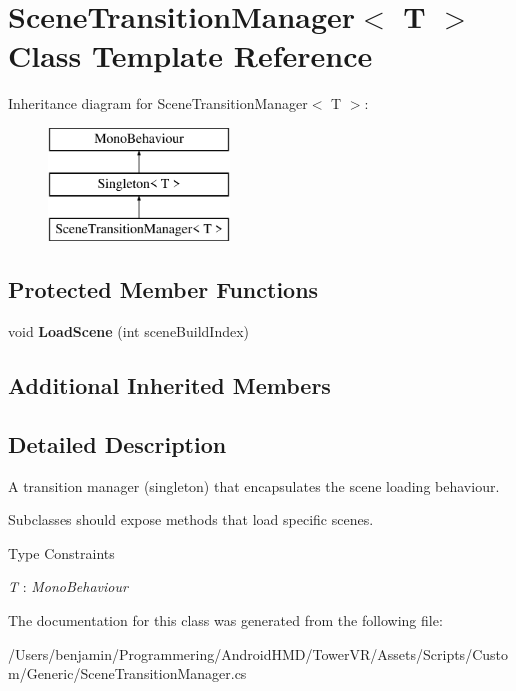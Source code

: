 \hypertarget{class_scene_transition_manager}{}\section{Scene\+Transition\+Manager$<$ T $>$ Class Template Reference}
\label{class_scene_transition_manager}
Inheritance diagram for Scene\+Transition\+Manager$<$ T $>$\+:\begin{figure}[H]
\begin{center}
\leavevmode
\includegraphics[height=3.000000cm]{class_scene_transition_manager}
\end{center}
\end{figure}
\subsection*{Protected Member Functions}
\begin{DoxyCompactItemize}
\item 
void {\bfseries Load\+Scene} (int scene\+Build\+Index)\hypertarget{class_scene_transition_manager_a1779dbd605c614cf8baf0797f08b3240}{}\label{class_scene_transition_manager_a1779dbd605c614cf8baf0797f08b3240}

\end{DoxyCompactItemize}
\subsection*{Additional Inherited Members}


\subsection{Detailed Description}
A transition manager (singleton) that encapsulates the scene loading behaviour.

Subclasses should expose methods that load specific scenes. \begin{Desc}
\item[Type Constraints]\begin{description}
\item[{\em T} : {\em Mono\+Behaviour}]\end{description}
\end{Desc}


The documentation for this class was generated from the following file\+:\begin{DoxyCompactItemize}
\item 
/\+Users/benjamin/\+Programmering/\+Android\+H\+M\+D/\+Tower\+V\+R/\+Assets/\+Scripts/\+Custom/\+Generic/Scene\+Transition\+Manager.\+cs\end{DoxyCompactItemize}
